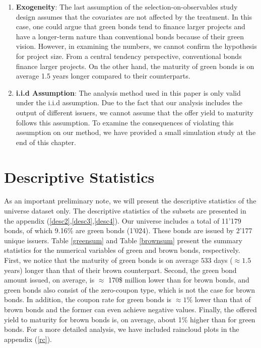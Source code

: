 \begin{enumerate}
    \item \textbf{Exogeneity}: The last assumption of the selection-on-observables study design assumes that the covariates are not affected by the treatment. In this case, one could argue that green bonds tend to finance larger projects and have a longer-term nature than conventional bonds because of their green vision. However, in examining the numbers, we cannot confirm the hypothesis for project size. From a central tendency perspective, conventional bonds finance larger projects. On the other hand, the maturity of green bonds is on average 1.5 years longer compared to their counterparts.
    
    \item \textbf{i.i.d Assumption}: The analysis method used in this paper is only valid under the i.i.d assumption. Due to the fact that our analysis includes the output of different issuers, we cannot assume that the offer yield to maturity follows this assumption. To examine the consequences of violating this assumption on our method, we have provided a small simulation study at the end of this chapter.
\end{enumerate}

\section{Descriptive Statistics}

As an important preliminary note, we will present the descriptive statistics of the universe dataset only. The descriptive statistics of the subsets are presented in the appendix (\ref{desc2},\ref{desc3},\ref{desc4}). Our universe includes a total of 11'179 bonds, of which 9.16\% are green bonds (1'024). These bonds are issued by 2'177 unique issuers. Table \ref{greensum} and Table \ref{brownsum} present the summary statistics for the numerical variables of green and brown bonds, respectively. First, we notice that the maturity of green bonds is on average $533$ days ($\approx 1.5$ years) longer than that of their brown counterpart. Second, the green bond amount issued, on average, is $\approx$ 170\$ million lower than for brown bonds, and green bonds also consist of the zero-coupon type, which is not the case for brown bonds. In addition, the coupon rate for green bonds is $\approx 1\%$ lower than that of brown bonds and the former can even achieve negative values. Finally, the offered yield to maturity for brown bonds is, on average, about 1\% higher than for green bonds. For a more detailed analysis, we have included raincloud plots in the appendix (\ref{rc}).

